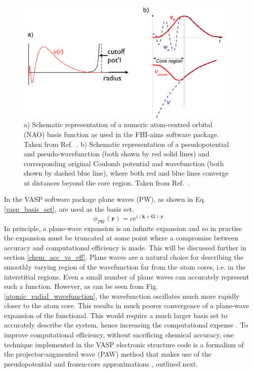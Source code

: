 \documentclass[11pt, twoside]{report}
\begin{document}
\begin{figure}[h!]
  \centering
    \includegraphics[width=0.95\textwidth]{figures/NACBF+PP.png}
    \caption[a) Schematic representation of a numeric atom-centred orbital (NAO) basis function as used in the FHI-aims software package. b) Schematic representation of a pseudopotential and pseudo-wavefunction (both shown by red solid lines) and corresponding original Coulomb potential and wavefunction (both shown by dashed blue line), where both red and blue lines converge at distances beyond the core region.]{a) Schematic representation of a numeric atom-centred orbital (NAO) basis function as used in the FHI-aims software package. Taken from Ref.~. b) Schematic representation of a pseudopotential and pseudo-wavefunction (both shown by red solid lines) and corresponding original Coulomb potential and wavefunction (both shown by dashed blue line), where both red and blue lines converge at distances beyond the core region. Taken from Ref.~.}
  \label{NACBF+PP}
\end{figure}

In the VASP software package \cite{VASP} plane waves (PW), as shown in Eq. \ref{vasp_basis_set}, are used as the basis set. 
\begin{equation}\label{vasp_basis_set}
\phi_{PW}(\mathbf{r}) = ce^{i(\mathbf{k}+\mathbf{G}).\mathbf{r}}
\end{equation}
In principle, a plane-wave expansion is an infinite expansion and so in practise the expansion must be truncated at some point where a compromise between accuracy and computational efficiency is made. This will be discussed further in section \ref{chem_acc_vs_eff}. Plane waves are a natural choice for describing the smoothly varying region of the wavefunction far from the atom cores, i.e. in the interstitial regions. Even a small number of plane waves can accurately represent such a function. However, as can be seen from Fig. \ref{atomic_radial_wavefunction}, the wavefunction oscillates much more rapidly closer to the atom core. This results in much poorer convergence of a plane-wave expansion of the functional. This would require a much larger basis set to accurately describe the system, hence increasing the computational expense \cite{Prasad_ch5}. To improve computational efficiency, without sacrificing chemical accuracy, one technique implemented in the VASP electronic structure code is a formalism of the projector-augmented wave (PAW) method \cite{PAW} that makes use of the pseudopotential and frozen-core approximations \cite{PAW_VASP}, outlined next.
\end{document}

